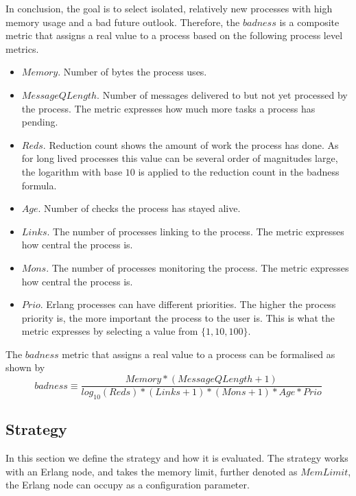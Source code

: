 \documentclass{llncs}
\begin{document}
In conclusion, the goal is to select isolated, relatively new processes with high memory usage and a bad future outlook. Therefore, the $\mathit{badness}$ is a composite metric that assigns a real value to a process based on the following process level metrics.
\begin{itemize}
\item $\mathit{Memory}$. Number of bytes the process uses.
\item $\mathit{MessageQLength}$. Number of messages delivered to but not yet processed by the process. The metric expresses how much more tasks a process has pending.
\item $\mathit{Reds}$. Reduction count shows the amount of work the process has done. As for long lived processes this value can be several order of magnitudes large, the logarithm with base $10$ is applied to the reduction count in the badness formula.
\item $\mathit{Age}$. Number of checks the process has stayed alive. 
\item $\mathit{Links}$. The number of processes linking to the process. The metric expresses how central the process is.
\item $\mathit{Mons}$. The number of processes monitoring the process. The metric expresses how central the process is.
\item $\mathit{Prio}$. Erlang processes can have different priorities. The higher the process priority is, the more important the process to the user is. This is what the metric expresses by selecting a value from $\{1,10,100\}$.
\end{itemize}
The $\mathit{badness}$ metric that assigns a real value to a process can be formalised as shown by 
$$
\mathit{badness} \equiv \frac{\mathit{Memory} * (\mathit{MessageQLength}+1)}{log_{10}(\mathit{Reds})*(\mathit{Links}+1)*(\mathit{Mons}+1)*\mathit{Age}*\mathit{Prio}}
$$


\subsection{Strategy}
In this section we define the strategy and how it is evaluated. The strategy works with an Erlang node, and takes the memory limit, further denoted as $\mathit{MemLimit}$, the Erlang node can occupy as a configuration parameter. 
\end{document}
